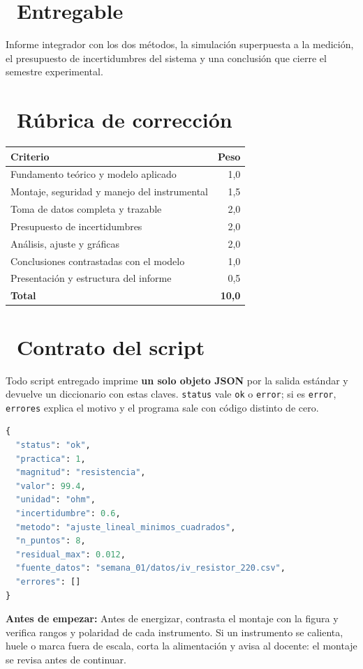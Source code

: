 \documentclass[11pt,a4paper]{article}
\newcommand{\iconotexto}[2]{\textcolor{cyanNeon}{\faIcon{#1}}~#2}
\begin{document}
\section{\iconotexto{box-open}{Entregable}}

Informe integrador con los dos métodos, la simulación superpuesta a la medición, el presupuesto de incertidumbres del sistema y una conclusión que cierre el semestre experimental.

\section{\iconotexto{ruler-combined}{Rúbrica de corrección}}

\begin{tabularx}{\linewidth}{@{}X r@{}}
\toprule
Criterio & Peso\\
\midrule
Fundamento teórico y modelo aplicado & 1,0 \\
Montaje, seguridad y manejo del instrumental & 1,5 \\
Toma de datos completa y trazable & 2,0 \\
Presupuesto de incertidumbres & 2,0 \\
Análisis, ajuste y gráficas & 2,0 \\
Conclusiones contrastadas con el modelo & 1,0 \\
Presentación y estructura del informe & 0,5 \\
\midrule
\textbf{Total} & \textbf{10,0}\\
\bottomrule
\end{tabularx}

\section{\iconotexto{code}{Contrato del script}}

\begin{cajaConcepto}Todo script entregado imprime \textbf{un solo objeto JSON} por la salida estándar y devuelve un diccionario con estas claves. \texttt{status} vale \texttt{ok} o \texttt{error}; si es \texttt{error}, \texttt{errores} explica el motivo y el programa sale con código distinto de cero.
\begin{lstlisting}[language=Python,style=estiloPython]
{
  "status": "ok",
  "practica": 1,
  "magnitud": "resistencia",
  "valor": 99.4,
  "unidad": "ohm",
  "incertidumbre": 0.6,
  "metodo": "ajuste_lineal_minimos_cuadrados",
  "n_puntos": 8,
  "residual_max": 0.012,
  "fuente_datos": "semana_01/datos/iv_resistor_220.csv",
  "errores": []
}

\end{lstlisting}
\end{cajaConcepto}

\begin{tcolorbox}[cajaMejora]\textbf{Antes de empezar:} Antes de energizar, contrasta el montaje con la figura y verifica rangos y polaridad de cada instrumento. Si un instrumento se calienta, huele o marca fuera de escala, corta la alimentación y avisa al docente: el montaje se revisa antes de continuar.
\end{tcolorbox}
\end{document}
